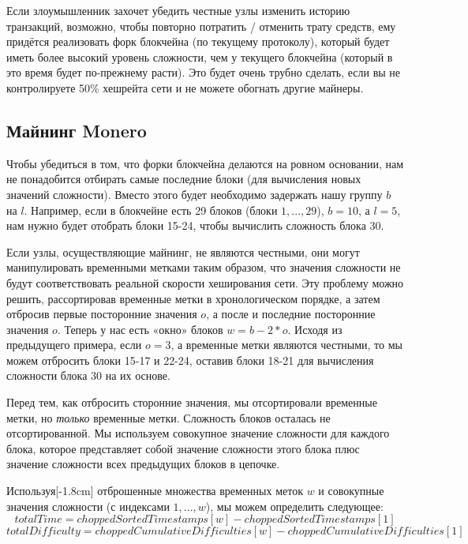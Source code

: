 Если злоумышленник захочет убедить честные узлы изменить историю транзакций, возмож\-но, чтобы повторно потратить / отменить трату средств, ему придётся реализовать форк блок\-чейна (по текущему протоколу), который будет иметь более высокий уровень сложности, чем у текущего блокчейна (который в это время будет по-прежнему расти). Это будет очень трубно сделать, если вы не контролируете 50\% хешрейта сети и не можете обогнать другие майнеры. \cite{Nakamoto_bitcoin}
 
\subsection{Майнинг Monero} %

Чтобы убедиться в том, что форки блокчейна делаются на ровном основании, нам не понадо\-бится отбирать самые последние блоки (для вычисления новых значений сложности). Вместо этого будет необходимо задержать нашу группу $b$ на $l$. Например, если в блокчейне есть 29 блоков (блоки $1,...,29$), $b = 10$, а $l = 5$, нам нужно будет отобрать блоки 15-24, чтобы вычислить сложность блока 30.

Если узлы, осуществляющие майнинг, не являются честными, они могут манипулировать временными метками таким образом, что значения сложности не будут соответствовать реаль\-ной скорости хеширования сети. Эту проблему можно решить, рассортировав временные метки в хронологическом порядке, а затем отбросив первые посторонние значения $o$, а после и последние посторонние значения $o$. Теперь у нас есть «окно» блоков $w = b-2*o$. Исходя из предыдущего примера, если $o = 3$, а временные метки являются честными, то мы можем отбросить блоки 15-17 и 22-24, оставив блоки 18-21 для вычисления сложности блока 30 на их основе.

Перед тем, как отбросить сторонние значения, мы отсортировали временные метки, но {\em только} временные метки. Сложность блоков осталась не отсортированной. Мы используем совокуп\-ное значение сложности для каждого блока, которое представляет собой значение сложности этого блока плюс значение сложности всех предыдущих блоков в цепочке.

Используя[-1.8cm] отброшенные множества временных меток $w$ и совокупные значения сложности (с индексами $1,...,w$), мы можем определить следующее:
\[ \mathit{totalTime} = \mathit{choppedSortedTimestamps}[w] - \mathit{choppedSortedTimestamps}[1]\]
\[ \mathit{totalDifficulty} = \mathit{choppedCumulativeDifficulties}[w] - \mathit{choppedCumulativeDifficulties}[1]\]

